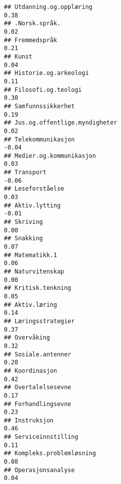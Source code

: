 \documentclass[
]{article}
\begin{document}
\begin{verbatim}
## Utdanning.og.opplæring                                                            0.38
## .Norsk.språk.                                                                     0.02
## Fremmedspråk                                                                      0.21
## Kunst                                                                             0.04
## Historie.og.arkeologi                                                             0.11
## Filosofi.og.teologi                                                               0.30
## Samfunnssikkerhet                                                                 0.19
## Jus.og.offentlige.myndigheter                                                     0.02
## Telekommunikasjon                                                                -0.04
## Medier.og.kommunikasjon                                                           0.03
## Transport                                                                        -0.06
## Leseforståelse                                                                    0.03
## Aktiv.lytting                                                                    -0.01
## Skriving                                                                          0.00
## Snakking                                                                          0.07
## Matematikk.1                                                                      0.06
## Naturvitenskap                                                                    0.00
## Kritisk.tenkning                                                                  0.05
## Aktiv.læring                                                                      0.14
## Læringsstrategier                                                                 0.37
## Overvåking                                                                        0.32
## Sosiale.antenner                                                                  0.20
## Koordinasjon                                                                      0.42
## Overtalelsesevne                                                                  0.17
## Forhandlingsevne                                                                  0.23
## Instruksjon                                                                       0.46
## Serviceinnstilling                                                                0.11
## Kompleks.problemløsning                                                           0.08
## Operasjonsanalyse                                                                 0.04

\end{verbatim}
\end{document}
